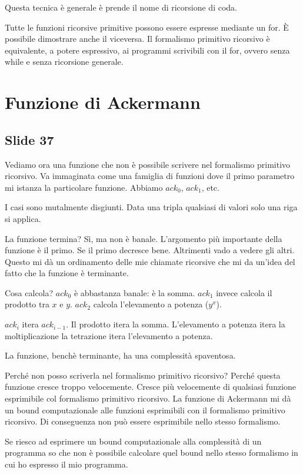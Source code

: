 Questa tecnica è generale è prende il nome di ricorsione di coda.

Tutte le funzioni ricorsive primitive possono essere espresse mediante un for. È possibile
dimostrare anche il viceversa. Il formalismo primitivo ricorsivo è equivalente, a potere
espressivo, ai programmi scrivibili con il for, ovvero senza while e senza ricorsione generale.

\section{Funzione di Ackermann}

\subsection{Slide 37}

Vediamo ora una funzione che non è possibile scrivere nel formalismo primitivo ricorsivo. Va
immaginata come una famiglia di funzioni dove il primo parametro mi istanza la particolare funzione.
Abbiamo $\textit{ack}_{0}$, $\textit{ack}_{1}$, etc.

I casi sono mutalmente disgiunti. Data una tripla qualsiasi di valori solo una riga si applica.

La funzione termina? Sì, ma non è banale. L'argomento più importante della funzione è il primo.
Se il primo decresce bene. Altrimenti vado a vedere gli altri. Questo mi dà un ordinamento delle
mie chiamate ricorsive che mi da un'idea del fatto che la funzione è terminante.

Cosa calcola? $\textit{ack}_{0}$ è abbastanza banale: è la somma. $\textit{ack}_{1}$ invece
calcola il prodotto tra $x$ e $y$. $\textit{ack}_{2}$ calcola l'elevamento a potenza ($y^x$).

$\textit{ack}_{i}$ itera $\textit{ack}_{i-1}$. Il prodotto itera la somma. L'elevamento a potenza
itera la moltiplicazione la tetrazione itera l'elevamento a potenza.

La funzione, benchè terminante, ha una complessità spaventosa.

Perché non posso scriverla nel formalismo primitivo ricorsivo? Perché questa funzione cresce
troppo velocemente. Cresce più velocemente di qualsiasi funzione esprimibile col formalismo
primitivo ricorsivo. La funzione di Ackermann mi dà un bound computazionale alle funzioni
esprimibili con il formalismo primitivo ricorsivo. Di conseguenza non può essere esprimibile nello
stesso formalismo.

Se riesco ad esprimere un bound computazionale alla complessità di un programma so che non è
possibile calcolare quel bound nello stesso formalismo in cui ho espresso il mio programma.


